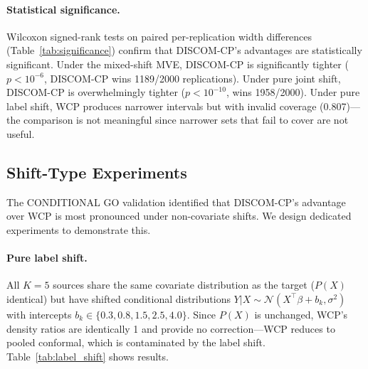 \documentclass{article}
\newcommand{\DISCOM}{\textsc{DISCOM-CP}}
\begin{document}
\paragraph{Statistical significance.}
Wilcoxon signed-rank tests on paired per-replication width differences (Table~\ref{tab:significance}) confirm that \DISCOM{}'s advantages are statistically significant. Under the mixed-shift MVE, \DISCOM{} is significantly tighter ($p < 10^{-6}$, \DISCOM{} wins 1189/2000 replications). Under pure joint shift, \DISCOM{} is overwhelmingly tighter ($p < 10^{-10}$, wins 1958/2000). Under pure label shift, WCP produces narrower intervals but with invalid coverage (0.807)---the comparison is not meaningful since narrower sets that fail to cover are not useful.

\subsection{Shift-Type Experiments}
\label{sec:shift_experiments}

The CONDITIONAL GO validation identified that \DISCOM{}'s advantage over WCP is most pronounced under non-covariate shifts. We design dedicated experiments to demonstrate this.

\paragraph{Pure label shift.}
All $K = 5$ sources share the same covariate distribution as the target ($P(X)$ identical) but have shifted conditional distributions $Y | X \sim \mathcal{N}(X^\top\beta + b_k, \sigma^2)$ with intercepts $b_k \in \{0.3, 0.8, 1.5, 2.5, 4.0\}$. Since $P(X)$ is unchanged, WCP's density ratios are identically 1 and provide no correction---WCP reduces to pooled conformal, which is contaminated by the label shift. Table~\ref{tab:label_shift} shows results.
\end{document}
